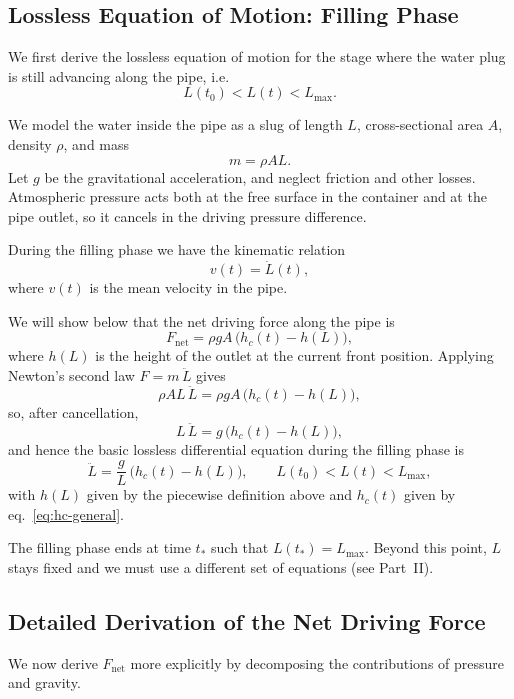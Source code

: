 \documentclass[11pt]{article}
\begin{document}
\subsection{Lossless Equation of Motion: Filling Phase}

We first derive the lossless equation of motion for the stage where the water
plug is still advancing along the pipe, i.e.
\[
L(t_0) < L(t) < L_{\max}.
\]

We model the water inside the pipe as a slug of length $L$, cross-sectional area
$A$, density $\rho$, and mass
\[
m = \rho A L.
\]
Let $g$ be the gravitational acceleration, and neglect friction and other losses.
Atmospheric pressure acts both at the free surface in the container and at the
pipe outlet, so it cancels in the driving pressure difference.

During the filling phase we have the kinematic relation
\begin{equation}
  v(t) = \dot L(t),
\end{equation}
where $v(t)$ is the mean velocity in the pipe.

We will show below that the net driving force along the pipe is
\begin{equation}
  F_{\text{net}} = \rho g A \,\bigl(h_c(t) - h(L)\bigr),
\end{equation}
where $h(L)$ is the height of the outlet at the current front position.
Applying Newton's second law $F = m\,\ddot L$ gives
\[
\rho A L \,\ddot L
= \rho g A \,\bigl(h_c(t) - h(L)\bigr),
\]
so, after cancellation,
\[
L \,\ddot L = g \,\bigl(h_c(t) - h(L)\bigr),
\]
and hence the basic lossless differential equation during the filling phase is
\begin{equation}
\ddot L
  = \frac{g}{L}\,\bigl(h_c(t) - h(L)\bigr),
  \qquad L(t_0) < L(t) < L_{\max},
  \label{eq:lossless-filling}
\end{equation}
with $h(L)$ given by the piecewise definition above and $h_c(t)$ given by
eq.~\eqref{eq:hc-general}.

The filling phase ends at time $t_\ast$ such that $L(t_\ast) = L_{\max}$.
Beyond this point, $L$ stays fixed and we must use a different set of
equations (see Part~II).

\subsection{Detailed Derivation of the Net Driving Force}

We now derive $F_{\text{net}}$ more explicitly by decomposing the contributions
of pressure and gravity.
\end{document}
